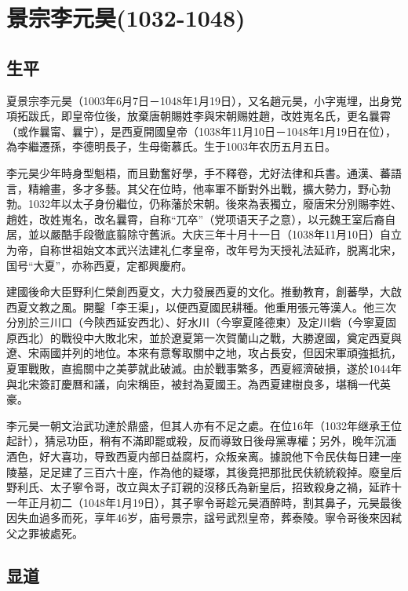 
\section{景宗李元昊\tiny(1032-1048)}

\subsection{生平}

夏景宗李元昊（1003年6月7日－1048年1月19日），又名趙元昊，小字嵬埋，出身党項拓跋氏，即皇帝位後，放棄唐朝賜姓李與宋朝赐姓趙，改姓嵬名氏，更名曩霄（或作曩甯、曩宁），是西夏開國皇帝（1038年11月10日－1048年1月19日在位），為李繼遷孫，李德明長子，生母衛慕氏。生于1003年农历五月五日。

李元昊少年時身型魁梧，而且勤奮好學，手不釋卷，尤好法律和兵書。通漢、蕃語言，精繪畫，多才多藝。其父在位時，他率軍不斷對外出戰，擴大勢力，野心勃勃。1032年以太子身份繼位，仍称藩於宋朝。後來為表獨立，廢唐宋分別賜李姓、趙姓，改姓嵬名，改名曩霄，自称“兀卒”（党项语天子之意），以元魏王室后裔自居，並以嚴酷手段徹底翦除守舊派。大庆三年十月十一日（1038年11月10日）自立为帝，自称世祖始文本武兴法建礼仁孝皇帝，改年号为天授礼法延祚，脱离北宋，国号“大夏”，亦称西夏，定都興慶府。

建國後命大臣野利仁榮創西夏文，大力發展西夏的文化。推動教育，創蕃學，大啟西夏文教之風。開鑿「李王渠」，以便西夏國民耕種。他重用張元等漢人。他三次分別於三川口（今陝西延安西北）、好水川（今寧夏隆德東）及定川砦（今寧夏固原西北）的戰役中大敗北宋，並於遼夏第一次賀蘭山之戰，大勝遼國，奠定西夏與遼、宋兩國并列的地位。本來有意奪取關中之地，攻占長安，但因宋軍頑強抵抗，夏軍戰敗，直搗關中之美夢就此破滅。由於戰事繁多，西夏經濟破損，遂於1044年與北宋簽訂慶曆和議，向宋稱臣，被封為夏國王。為西夏建樹良多，堪稱一代英豪。

李元昊一朝文治武功達於鼎盛，但其人亦有不足之處。在位16年（1032年继承王位起計），猜忌功臣，稍有不滿即罷或殺，反而導致日後母黨專權；另外，晚年沉湎酒色，好大喜功，导致西夏内部日益腐朽，众叛亲离。據說他下令民伕每日建一座陵墓，足足建了三百六十座，作為他的疑塚，其後竟把那批民伕統統殺掉。廢皇后野利氏、太子寧令哥，改立與太子訂親的沒移氏為新皇后，招致殺身之禍，延祚十一年正月初二（1048年1月19日），其子寧令哥趁元昊酒醉時，割其鼻子，元昊最後因失血過多而死，享年46岁，庙号景宗，諡号武烈皇帝，葬泰陵。寧令哥後來因弒父之罪被處死。

\subsection{显道}

